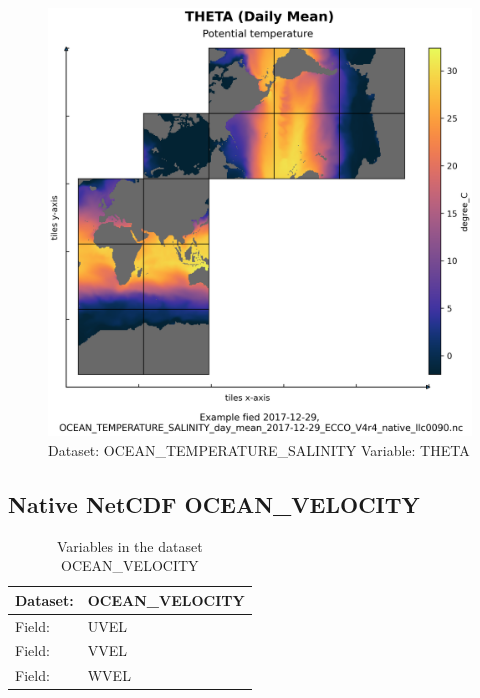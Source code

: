 \begin{figure}[H]
\centering
\includegraphics[scale=0.55]{../images/plots/native_plots/Ocean_Temperature_and_Salinity/THETA.png}
\caption{Dataset: OCEAN\_TEMPERATURE\_SALINITY Variable: THETA}
\label{tab:table-OCEAN_TEMPERATURE_SALINITY_THETA-Plot}
\end{figure}
\pagebreak
\subsection{Native NetCDF OCEAN\_VELOCITY}
\newp
\begin{longtable}{|p{}|p{}|}
\caption{Variables in the dataset OCEAN\_VELOCITY}
\label{tab:table-OCEAN_VELOCITY-fields} \\ 
\hline \endhead \hline \endfoot
\rowcolor{lightgray} \textbf{Dataset:} & \textbf{OCEAN\_VELOCITY} \\ \hline
Field: &UVEL \\ \hline
Field: &VVEL \\ \hline
Field: &WVEL \\ \hline
\end{longtable}

\pagebreak
